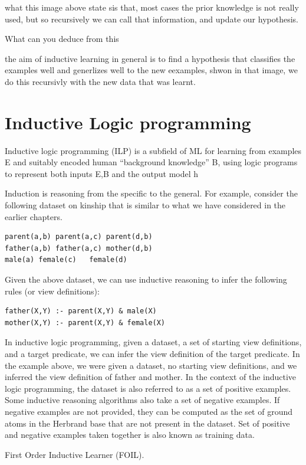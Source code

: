 \documentclass{article}
\theoremstyle{mytheoremstyle}
\theoremstyle{mytheoremstyle}
\theoremstyle{myproblemstyle}
\begin{document}
what this image above state sis that, most cases the prior knowledge is not really used, but so recursively we can call that information, and update our hypothesis.


What can you deduce from this

the aim of inductive learning in general is to find a hypothesis that classifies the examples well and generlizes well to the new eexamples, shwon in that image, we do this recursivly with the new data that was learnt.

\section{Inductive Logic programming}
Inductive logic programming (ILP) is a subfield of ML for learning from examples E and suitably encoded human “background knowledge” B, using logic programs to represent both inputs E,B and the output model h

Induction is reasoning from the specific to the general. For example, consider the following dataset on kinship that is similar to what we have considered in the earlier chapters.

\begin{lstlisting}
parent(a,b)	parent(a,c)	parent(d,b)
father(a,b)	father(a,c)	mother(d,b)
male(a)	female(c)	female(d)
\end{lstlisting}

Given the above dataset, we can use inductive reasoning to infer the following rules (or view definitions):
\begin{lstlisting}
father(X,Y) :- parent(X,Y) & male(X)
mother(X,Y) :- parent(X,Y) & female(X)
\end{lstlisting}
In inductive logic programming, given a dataset, a set of starting view definitions, and a target predicate, we can infer the view definition of the target predicate. In the example above, we were given a dataset, no starting view definitions, and we inferred the view definition of father and mother. In the context of the inductive logic programming, the dataset is also referred to as a set of positive examples. Some inductive reasoning algorithms also take a set of negative examples. If negative examples are not provided, they can be computed as the set of ground atoms in the Herbrand base that are not present in the dataset. Set of positive and negative examples taken together is also known as training data.

\item First Order Inductive Learner (FOIL).
\end{document}
